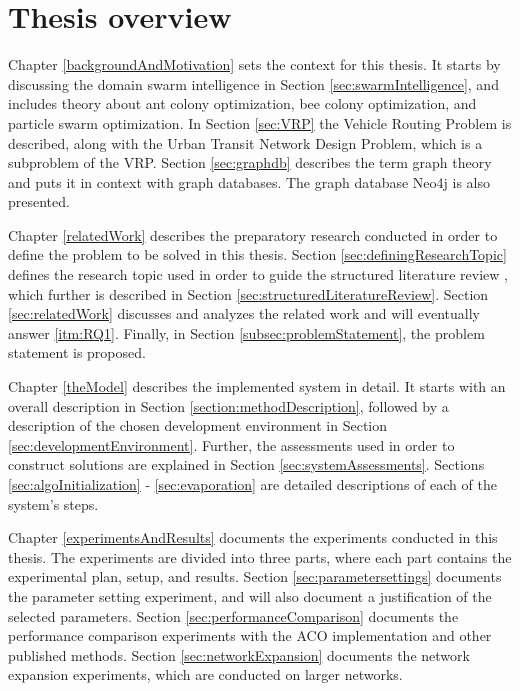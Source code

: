 \section{Thesis overview}



Chapter \ref{backgroundAndMotivation} sets the context for this thesis. It starts by discussing the domain swarm intelligence in Section \ref{sec:swarmIntelligence}, and includes theory about ant colony optimization, bee colony optimization, and particle swarm optimization. In Section \ref{sec:VRP} the Vehicle Routing Problem is described, along with the Urban Transit Network Design Problem, which is a subproblem of the VRP. Section \ref{sec:graphdb} describes the term graph theory and puts it in context with graph databases. The graph database Neo4j is also presented. 

Chapter \ref{relatedWork} describes the preparatory research conducted in order to define the problem to be solved in this thesis. Section \ref{sec:definingResearchTopic} defines the research topic used in order to guide the structured literature review \citep{kofod2014}, which further is described in Section \ref{sec:structuredLiteratureReview}. Section \ref{sec:relatedWork} discusses and analyzes the related work and will eventually answer \ref{itm:RQ1}. Finally, in Section \ref{subsec:problemStatement}, the problem statement is proposed.  

Chapter \ref{theModel} describes the implemented system in detail. It starts with an overall description in Section \ref{section:methodDescription}, followed by a description of the chosen development environment in Section \ref{sec:developmentEnvironment}. Further, the assessments used in order to construct solutions are explained in Section \ref{sec:systemAssessments}. Sections \ref{sec:algoInitialization} - \ref{sec:evaporation} are detailed descriptions of each of the system's steps.

Chapter \ref{experimentsAndResults} documents the experiments conducted in this thesis. The experiments are divided into three parts, where each part contains the experimental plan, setup, and results. Section \ref{sec:parametersettings} documents the parameter setting experiment, and will also document a justification of the selected parameters. Section \ref{sec:performanceComparison} documents the performance comparison experiments with the ACO implementation and other published methods. Section \ref{sec:networkExpansion} documents the network expansion experiments, which are conducted on larger networks. 

